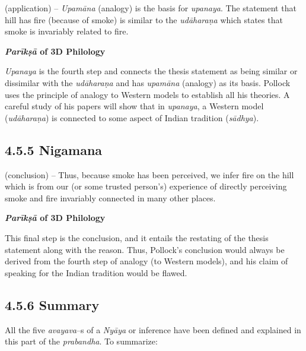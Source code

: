 (application) – \textit{Upamāna} (analogy) is the basis for \textit{upanaya}. The statement that hill has fire (because of smoke) is similar to the \textit{udāharaṇa} which states that smoke is invariably related to fire.

\textbf{\textit{Parīkṣā} of 3D Philology}

\textit{Upanaya} is the fourth step and connects the thesis statement as being similar or dissimilar with the \textit{udāharaṇa} and has \textit{upamāna} (analogy) as its basis. Pollock uses the principle of analogy to Western models to establish all his theories. A careful study of his papers will show that in \textit{upanaya}, a Western model (\textit{udāharaṇa}) is connected to some aspect of Indian tradition (\textit{sādhya}).


\subsection*{4.5.5 Nigamana\protect{}}

(conclusion) – Thus, because smoke has been perceived, we infer fire on the hill which is from our (or some trusted person’s) experience of directly perceiving smoke and fire invariably connected in many other places.

\textbf{\textit{Parīkṣā} of 3D Philology}

This final step is the conclusion, and it entails the restating of the thesis statement along with the reason. Thus, Pollock’s conclusion would always be derived from the fourth step of analogy (to Western models), and his claim of speaking for the Indian tradition would be flawed.


\subsection*{4.5.6 Summary}

All the five \textit{avayava}–s of a \textit{Nyāya} or inference have been defined and explained in this part of the \textit{prabandha}. To summarize:

